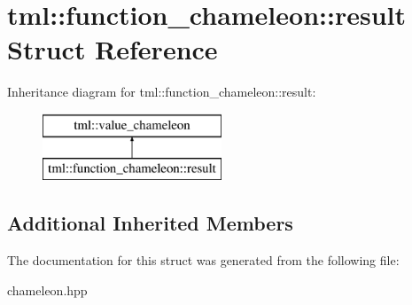 \hypertarget{structtml_1_1function__chameleon_1_1result}{\section{tml\+:\+:function\+\_\+chameleon\+:\+:result Struct Reference}
\label{structtml_1_1function__chameleon_1_1result}
}
Inheritance diagram for tml\+:\+:function\+\_\+chameleon\+:\+:result\+:\begin{figure}[H]
\begin{center}
\leavevmode
\includegraphics[height=2.000000cm]{structtml_1_1function__chameleon_1_1result}
\end{center}
\end{figure}
\subsection*{Additional Inherited Members}


The documentation for this struct was generated from the following file\+:\begin{DoxyCompactItemize}
\item 
chameleon.\+hpp\end{DoxyCompactItemize}
